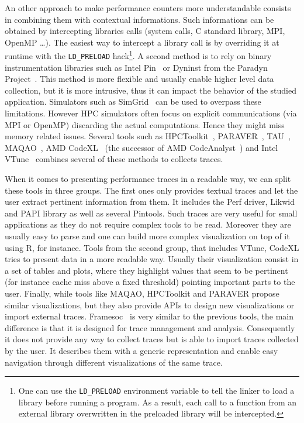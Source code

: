 An other approach to make performance counters more understandable consists in combining them with contextual informations.
Such informations can be obtained by intercepting libraries calls (system calls, C standard library, \gls{MPI}, \gls{OpenMP} \ldots).
The easiest way to intercept a library call is by overriding it at runtime with the \texttt{LD\_PRELOAD} hack\footnote{
    One can use the \texttt{LD\_PRELOAD} environment variable to tell the linker to load a library before running a program.
    As a result, each call to a function from an external library overwritten in the preloaded library will be intercepted.}.
A second method is to rely on binary instrumentation libraries such as \gls{Intel} \gls{Pin}~\cite{Luk05Pin} or Dyninst from the Paradyn Project~\cite{Miller95Paradyn}.
This method is more flexible and usually enable higher level data collection, but it is more intrusive, thus it can impact the behavior of the studied application.
Simulators such as \gls{SimGrid}~\cite{Casanova14Versatile} can be used to overpass these limitations.%
However \gls{HPC} simulators often focus on explicit communications (via \gls{MPI} or \gls{OpenMP}) discarding the actual computations.
Hence they might miss memory related issues.
Several tools such as \gls{HPCToolkit}~\cite{Adhianto10HPCTOOLKIT}, \gls{PARAVER}~\cite{Pillet95PARAVER}, \gls{TAU}~\cite{Shende06Tau}, \gls{MAQAO}~\cite{Djoudi05MAQAO}, \gls{AMD} \gls{CodeXL}~\cite{AMD16CodeXL} (the successor of \gls{AMD} \gls{CodeAnalyst}~\cite{Drongowski08introduction}) and \gls{Intel} \gls{VTune}~\cite{Reinders05VTune} combines several of these methods to collects traces.

When it comes to presenting performance traces in a readable way, we can split these tools in three groups.
The first ones only provides textual traces and let the user extract pertinent information from them.
It includes the \gls{Perf} driver, \gls{Likwid} and \gls{PAPI} library as well as several \glspl{Pintool}.
Such traces are very useful for small applications as they do not require complex tools to be read.
Moreover they are usually easy to parse and one can build more complex visualization on top of it using \gls{R}, for instance.
Tools from the second group, that includes \gls{VTune}, \gls{CodeXL} tries to present data in a more readable way.
Usually their visualization consist in a set of tables and plots, where they highlight values that seem to be pertinent (for instance cache miss above a fixed threshold) pointing important parts to the user.
Finally, while tools like \gls{MAQAO}, \gls{HPCToolkit} and \gls{PARAVER} propose similar visualizations, but they also provide \glspl{API} to design new visualizations or import external traces.
\gls{Framesoc}~\cite{Pagano13Trace,Pagano14frameSoC} is very similar to the previous tools, the main difference is that it is designed for trace management and analysis.
Consequently it does not provide any way to collect traces but is able to import traces collected by the user.
It describes them with a generic representation and enable easy navigation through different visualizations of the same trace.

